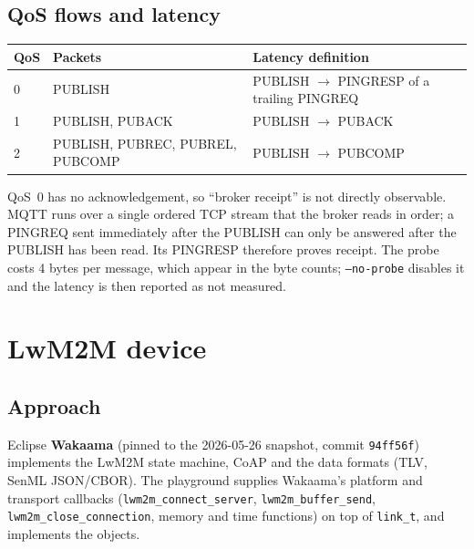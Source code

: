 \documentclass[11pt,a4paper]{article}
\newcommand{\code}[1]{\texttt{#1}}
\begin{document}
\subsection{QoS flows and latency}
\begin{center}
\begin{tabular}{@{}lll@{}}
\toprule
QoS & Packets & Latency definition \\
\midrule
0 & PUBLISH & PUBLISH $\rightarrow$ PINGRESP of a trailing PINGREQ \\
1 & PUBLISH, PUBACK & PUBLISH $\rightarrow$ PUBACK \\
2 & PUBLISH, PUBREC, PUBREL, PUBCOMP & PUBLISH $\rightarrow$ PUBCOMP \\
\bottomrule
\end{tabular}
\end{center}
QoS~0 has no acknowledgement, so ``broker receipt'' is not directly
observable. MQTT runs over a single ordered TCP stream that the broker reads in
order; a PINGREQ sent immediately after the PUBLISH can only be answered after
the PUBLISH has been read. Its PINGRESP therefore proves receipt. The probe
costs 4 bytes per message, which appear in the byte counts;
\code{--no-probe} disables it and the latency is then reported as not measured.

\section{LwM2M device}

\subsection{Approach}
Eclipse \textbf{Wakaama} (pinned to the 2026-05-26 snapshot, commit
\code{94ff56f}) implements the LwM2M state machine, CoAP and the data formats
(TLV, SenML JSON/CBOR). The playground supplies Wakaama's platform and
transport callbacks (\code{lwm2m\_connect\_server}, \code{lwm2m\_buffer\_send},
\code{lwm2m\_close\_connection}, memory and time functions) on top of
\code{link\_t}, and implements the objects.
\end{document}
